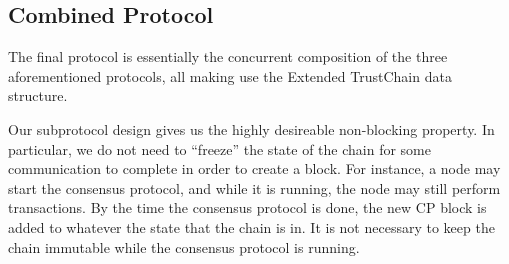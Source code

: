 



\subsection{Combined Protocol}
\label{sec:combined-protocol}
The final protocol is essentially the concurrent composition of the three aforementioned protocols,
all making use the Extended TrustChain data structure.

Our subprotocol design gives us the highly desireable non-blocking property.
In particular, we do not need to ``freeze'' the state of the chain for some communication to complete in order to create a block.
For instance, a node may start the consensus protocol, and while it is running, the node may still perform transactions.
By the time the consensus protocol is done, the new CP block is added to whatever the state that the chain is in.
It is not necessary to keep the chain immutable while the consensus protocol is running.

